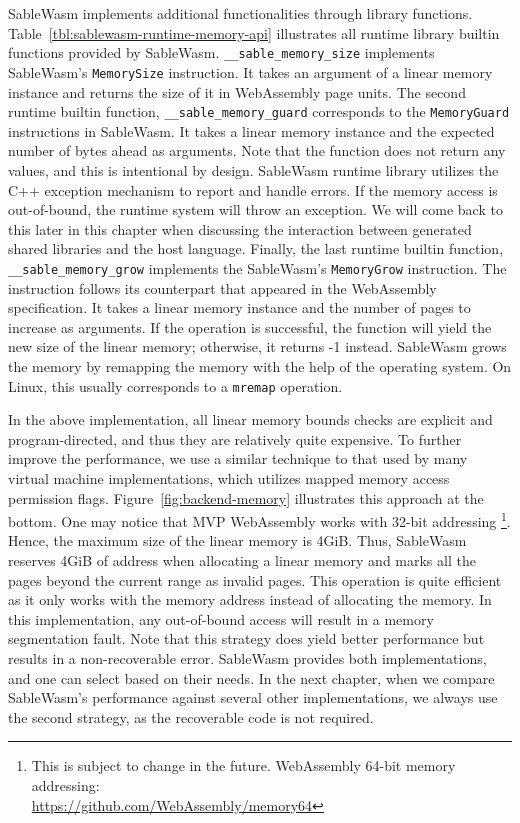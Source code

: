 SableWasm implements additional functionalities through library functions.
Table~\ref{tbl:sablewasm-runtime-memory-api} illustrates all runtime library
builtin functions provided by SableWasm. \texttt{\_\_sable\_memory\_size}
implements SableWasm's \texttt{MemorySize} instruction. It takes an argument of
a linear memory instance and returns the size of it in WebAssembly page units.
The second runtime builtin function, \texttt{\_\_sable\_memory\_guard}
corresponds to the \texttt{MemoryGuard} instructions in SableWasm. It takes
a linear memory instance and the expected number of bytes ahead as arguments.
Note that the function does not return any values, and this is intentional
by design. SableWasm runtime library utilizes the C++ exception mechanism to
report and handle errors. If the memory access is out-of-bound, the runtime
system will throw an exception. We will come back to this later in this chapter
when discussing the interaction between generated shared libraries and the
host language. Finally, the last runtime builtin function,
\texttt{\_\_sable\_memory\_grow} implements the SableWasm's \texttt{MemoryGrow}
instruction. The instruction follows its counterpart that appeared in the
WebAssembly specification. It takes a linear memory instance and the number of
pages to increase as arguments. If the operation is successful, the function
will yield the new size of the linear memory; otherwise, it returns -1 instead.
SableWasm grows the memory by remapping the memory with the help of the
operating system. On Linux, this usually corresponds to a
\texttt{mremap} operation.

In the above implementation, all linear memory bounds checks are explicit and
program-directed, and thus they are relatively quite expensive. To further
improve the performance, we use a similar technique to that used by many
virtual machine implementations, which utilizes mapped memory access permission
flags. Figure~\ref{fig:backend-memory} illustrates this approach at the bottom.
One may notice that MVP WebAssembly works with 32-bit addressing
\footnote{This is subject to change in the future.
    WebAssembly 64-bit memory addressing:\\
    \url{https://github.com/WebAssembly/memory64}}. Hence, the maximum size of
the linear memory is 4GiB. Thus, SableWasm reserves 4GiB of address when
allocating a linear memory and marks all the pages beyond the current range as
invalid pages. This operation is quite efficient as it only works with the
memory address instead of allocating the memory. In this implementation, any
out-of-bound access will result in a memory segmentation fault. Note that this
strategy does yield better performance but results in a non-recoverable error.
SableWasm provides both implementations, and one can select based on their
needs. In the next chapter, when we compare SableWasm's performance against
several other implementations, we always use the second strategy, as the
recoverable code is not required.

